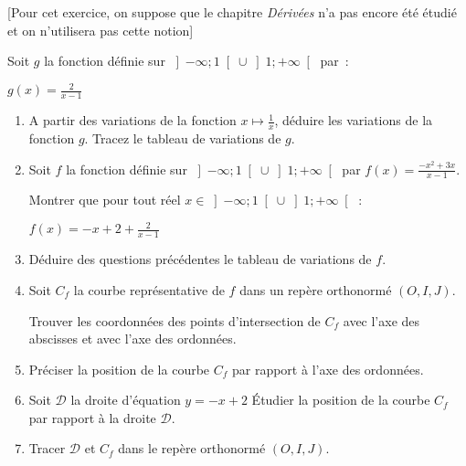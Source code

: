 
%
[Pour cet exercice, on suppose que le chapitre \textit{Dérivées} n'a pas encore été étudié et on n'utilisera pas cette notion]
\par
Soit $g$ la fonction définie sur $\left]-\infty  ; 1\right[ \cup  \left]1 ; +\infty \right[$ par~:

\begin{center}
$g\left(x\right)=\frac{2}{x-1}$
\end{center}

\begin{enumerate}
     \item
     A partir des variations de la fonction $x \mapsto  \frac{1}{x}$, déduire les variations de la fonction $g$. Tracez le tableau de variations de $g$.
     \item
     Soit $f$ la fonction définie sur $\left]-\infty  ; 1\right[ \cup  \left]1 ; +\infty \right[$ par $f\left(x\right)=\frac{-x^{2}+3x}{x-1}$.
     \par
     Montrer que pour tout réel $x \in  \left]-\infty  ; 1\right[ \cup  \left]1 ; +\infty \right[$ :
     \par
     $f\left(x\right)=-x+2+\frac{2}{x-1}$
     \item
     Déduire des questions précédentes le tableau de variations de $f$.
     \item
     Soit $C_{f}$ la courbe représentative de $f$ dans un repère orthonormé $\left(O, I, J\right)$.
     \par
     Trouver les coordonnées des points d'intersection de $C_{f}$ avec l'axe des abscisses et avec l'axe des ordonnées.
     \item
     Préciser la position de la courbe  $C_{f}$ par rapport à l'axe des ordonnées.
     \item
     Soit $\mathscr D$ la droite d'équation $y=-x+2$ Étudier la position de la courbe  $C_{f}$ par rapport à la droite $\mathscr D$.
     \item
     Tracer $\mathscr D$ et  $C_{f}$ dans le repère orthonormé $\left(O, I, J\right)$.
\end{enumerate}

